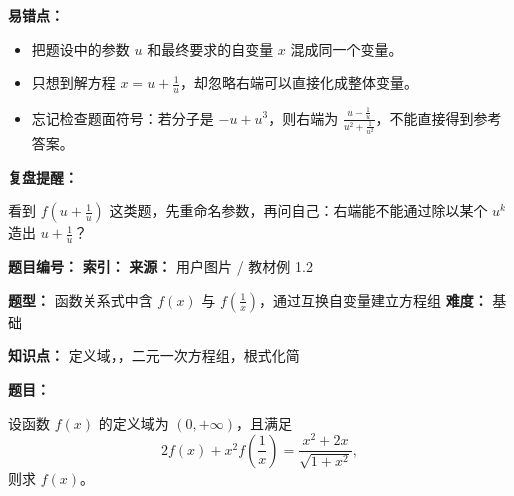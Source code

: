 \begin{mistakeBox}
\textbf{易错点：}

\begin{itemize}
  \item 把题设中的参数 \(u\) 和最终要求的自变量 \(x\) 混成同一个变量。
  \item 只想到解方程 \(x=u+\frac{1}{u}\)，却忽略右端可以直接化成整体变量。
  \item 忘记检查题面符号：若分子是 \(-u+u^3\)，则右端为 \(\frac{u-\frac{1}{u}}{u^2+\frac{1}{u^2}}\)，不能直接得到参考答案。
\end{itemize}

\textbf{复盘提醒：}

看到 \(f\left(u+\frac{1}{u}\right)\) 这类题，先重命名参数，再问自己：右端能不能通过除以某个 \(u^k\) 造出 \(u+\frac{1}{u}\)？
\end{mistakeBox}


\begin{problemBox}
\begin{problemMeta}
\textbf{题目编号：}  \quad
\textbf{索引：}  \quad
\textbf{来源：} 用户图片 / 教材例 1.2

\textbf{题型：} 函数关系式中含 \(f(x)\) 与 \(f\left(\frac{1}{x}\right)\)，通过互换自变量建立方程组 \quad
\textbf{难度：} 基础

\textbf{知识点：} 定义域，，二元一次方程组，根式化简
\end{problemMeta}

\textbf{题目：}

设函数 \(f(x)\) 的定义域为 \((0,+\infty)\)，且满足
\[
2f(x)+x^2f\left(\frac{1}{x}\right)=\frac{x^2+2x}{\sqrt{1+x^2}},
\]
则求 \(f(x)\)。
\end{problemBox}

